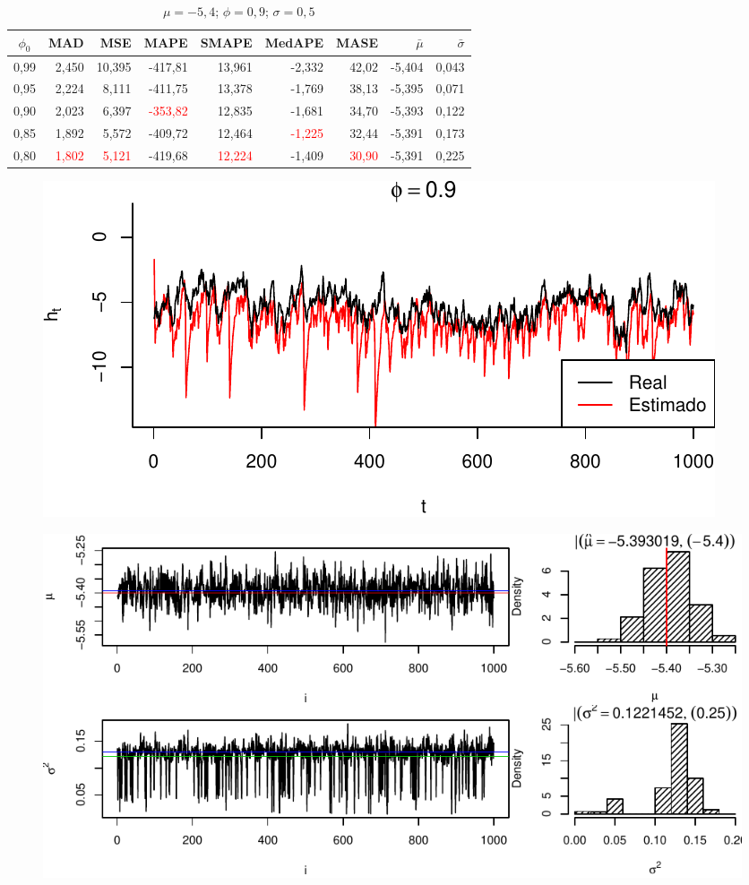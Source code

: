 \documentclass[12pt, a4paper]{article}
\begin{document}
\newpage
\begin{table}[ht]
  \centering
  \caption{$\mu =-5,4$; $\phi = 0,9$; $\sigma = 0,5$}
  \begin{tabular}{c|rrrrrr|rr}
    \hline
    $\phi_0$ & MAD & MSE & MAPE & SMAPE & MedAPE & MASE & $\bar{\mu}$ & $\bar{\sigma}$\\
    \hline
    0,99 & 2,450 & 10,395 & -417,81 & 13,961 & -2,332 & 42,02 & -5,404 & 0,043\\
    0,95 & 2,224 & 8,111 & -411,75 & 13,378 & -1,769 & 38,13 & -5,395 & 0,071\\
    0,90 & 2,023 & 6,397 & \textcolor{red}{-353,82} & 12,835 & -1,681 & 34,70 & -5,393 & 0,122\\
    0,85 & 1,892 & 5,572 & -409,72 & 12,464 & \textcolor{red}{-1,225} & 32,44 & -5,391 & 0,173\\
    0,80 & \textcolor{red}{1,802} & \textcolor{red}{5,121} & -419,68 & \textcolor{red}{12,224} & -1,409 & \textcolor{red}{30,90} & -5,391 & 0,225\\
    \hline
  \end{tabular}  
\end{table}

\begin{figure}[ht]
  \centering
  \includegraphics{img/p09s05_final}
\end{figure}

\begin{figure}[H]
  \centering
  \includegraphics{img/p09s05_resultado}
\end{figure}
\end{document}
